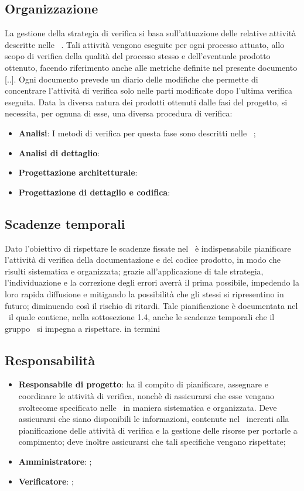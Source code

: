 \documentclass[../PianoDiQualifica.tex]{subfiles}
\begin{document}
		\subsection{Organizzazione}
		La gestione della strategia di verifica si basa sull'attuazione delle relative attività descritte nelle \normediprogetto\ . Tali attività vengono eseguite per ogni processo attuato, allo scopo di verifica della qualità del processo stesso e dell'eventuale prodotto ottenuto, facendo riferimento anche alle metriche definite nel presente documento [..].
		Ogni documento prevede un diario delle modifiche che permette di concentrare l'attività di verifica solo nelle parti modificate dopo l'ultima verifica eseguita.
		Data la diversa natura dei prodotti ottenuti dalle fasi del progetto, si necessita, per ognuna di esse, una diversa procedura di verifica:
		\begin{itemize}
		\item \textbf{Analisi}: I metodi di verifica per questa fase sono descritti nelle \normediprogetto\ ;
		\item \textbf{Analisi di dettaglio}:
		\item \textbf{Progettazione architetturale}:
		\item \textbf{Progettazione di dettaglio e codifica}:
		\end{itemize} 
		
		\subsection{Scadenze temporali}
		Dato l'obiettivo di rispettare le scadenze fissate nel \pianodiprogetto\, è indispensabile pianificare l'attività di verifica della documentazione e del codice prodotto, in modo che risulti sistematica e organizzata; grazie all'applicazione di tale strategia, l'individuazione e la correzione degli errori averrà il prima possibile, impedendo la loro rapida diffusione e mitigando la possibilità che gli stessi si ripresentino in futuro; diminuendo così il rischio di ritardi. Tale pianificazione è documentata nel \pianodiprogetto\, il quale contiene, nella sottosezione 1.4, anche le scadenze temporali che il gruppo \kaleidoscode\ si impegna a rispettare.
		in termini
		\subsection{Responsabilità}
		\begin{itemize}
		\item \textbf{Responsabile di progetto}: ha il compito di pianificare, assegnare e coordinare le attività di verifica, nonchè di assicurarsi che esse vengano svoltecome specificato nelle \normediprogetto\, in maniera sistematica e organizzata. Deve assicurarsi che siano disponibili le informazioni, contenute nel \pianodiprogetto\, inerenti alla pianificazione delle attività di verifica e la gestione delle risorse per portarle a compimento; deve inoltre assicurarsi che tali specifiche vengano rispettate;
		\item \textbf{Amministratore}: ;
		\item \textbf{Verificatore}: ;
		\end{itemize}
\end{document}
